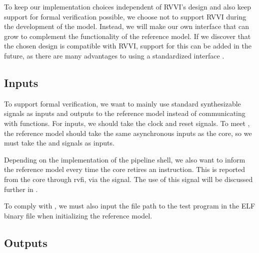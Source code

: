 To keep our implementation choices independent of RVVI's design and also keep support for formal verification possible, we choose not to support RVVI during the development of the model. Instead, we will make our own interface that can grow to complement the functionality of the reference model. If we discover that the chosen design is compatible with RVVI, support for this can be added in the future, as there are many advantages to using a standardized interface \cite{riscv-verificationRISCVVerificationInterface2023}.


\subsection{Inputs}

To support formal verification, we want to mainly use standard synthesizable signals as inputs and outputs to the reference model instead of communicating with functions. For inputs, we should take the clock and reset signals. To meet , the reference model should take the same asynchronous inputs as the core, so we must take the  and  signals as inputs. 

Depending on the implementation of the pipeline shell, we also want to inform the reference model every time the core retires an instruction. This is reported from the core through \acrshort{rvfi}, via the  signal. The use of this signal will be discussed further in .

To comply with , we must also input the file path to the test program in the ELF binary file when initializing the reference model. 

%

\subsection{Outputs}

